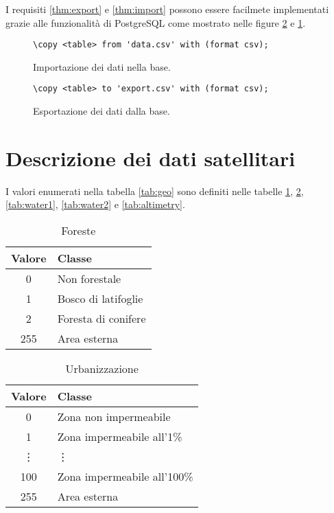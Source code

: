 \documentclass[draft]{article}
\begin{document}
I requisiti \ref{thm:export} e \ref{thm:import} possono essere facilmete
implementati grazie alle funzionalità di PostgreSQL come mostrato nelle figure
\ref{fig:export} e \ref{fig:import}.

\begin{figure}
\centering\verb+\copy <table> from 'data.csv' with (format csv);+
\caption{Importazione dei dati nella base.}
\label{fig:import}
\end{figure}

\begin{figure}
\centering\verb+\copy <table> to 'export.csv' with (format csv);+
\caption{Esportazione dei dati dalla base.}
\label{fig:export}
\end{figure}

\appendix

\section{Descrizione dei dati satellitari}\label{sec:desc}

I valori enumerati nella tabella \ref{tab:geo} sono definiti nelle tabelle
\ref{tab:forest}, \ref{tab:urbanization}, \ref{tab:water1}, \ref{tab:water2} e
\ref{tab:altimetry}.

\begin{table}
\centering
\begin{tabular}{|c|l|}
\hline
\textbf{Valore} & \textbf{Classe}\\
\hline
0 & Non forestale\\
1 & Bosco di latifoglie\\
2 & Foresta di conifere\\
255 & Area esterna\\
\hline
\end{tabular}
\caption{Foreste}
\label{tab:forest}
\end{table}

\begin{table}
\centering
\begin{tabular}{|c|l|}
\hline
\textbf{Valore} & \textbf{Classe}\\
\hline
0 & Zona non impermeabile\\
1 & Zona impermeabile all'1\%\\
\vdots & \vdots\\
100 & Zona impermeabile all'100\%\\
255 & Area esterna\\
\hline
\end{tabular}
\caption{Urbanizzazione}
\label{tab:urbanization}
\end{table}
\end{document}
